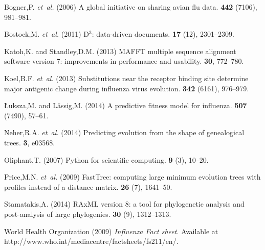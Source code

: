 \documentclass{bioinfo}
\begin{document}
\begin{thebibliography}{}

Bogner,P. {\em et~al.} (2006{\em{}}) A global
  initiative on sharing avian flu data.
 {\bf 442} (7106), 981--981.

Bostock,M. {\em et~al.} (2011{\em{}}) D$^3$: data-driven
  documents.
 {\bf 17} (12), 2301--2309.

Katoh,K. and Standley,D.M. (2013{\em{}}) {MAFFT} multiple sequence alignment
  software version 7: improvements in performance and usability.
 {\bf 30}, 772--780.

Koel,B.F. {\em et~al.} (2013{\em{}})
  Substitutions near the receptor binding site determine major antigenic change
  during influenza virus evolution.
 {\bf 342} (6161), 976--979.

\L{}uksza,M. and L\"a{}ssig,M. (2014{\em{}}) A predictive fitness model for
  influenza.
 {\bf 507} (7490), 57--61.

Neher,R.A. {\em et~al.} (2014{\em{}}) Predicting evolution
  from the shape of genealogical trees.
 {\bf 3}, e03568.

Oliphant,T. (2007{\em{}}) Python for scientific computing.
 {\bf 9} (3), 10--20.

Price,M.N. {\em et~al.} (2009{\em{}}) {FastTree:} computing
  large minimum evolution trees with profiles instead of a distance matrix.
 {\bf 26} (7), 1641--50.

Stamatakis,A. (2014{\em{}}) {RAxML} version 8: a tool for phylogenetic analysis
  and post-analysis of large phylogenies.
 {\bf 30} (9), 1312--1313.

{World Health Organization} (2009{\em{}}) {\em {Influenza Fact sheet}}.
\newblock Available at http://www.who.int/mediacentre/factsheets/fs211/en/.

\end{thebibliography}
\end{document}
